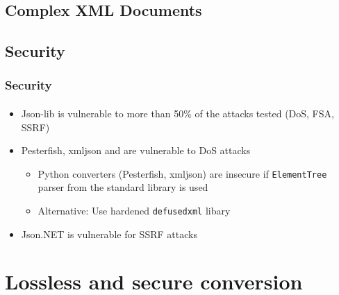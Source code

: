 \documentclass[
    alternativetitlepage=alternativ,
    cornerlogo=hgi_nds_logo2,
    sectionoverview,
]{rubpresentation}
\begin{document}
\subsection{Complex XML Documents}

\begingroup
  \begin{frame}[fragile]
    \vspace{-1.15cm}
    \begin{center}
      
    \end{center}
  \end{frame}
\endgroup

\subsection{Security}

\begin{frame}
  \frametitle{Security}
  \framesubtitle{}
  \begin{itemize}
    \item{} Json-lib is vulnerable to more than 50\% of the attacks tested (DoS, FSA, SSRF)
    \item{} Pesterfish, xmljson and are vulnerable to DoS attacks
      \begin{itemize}
        \item{} Python converters (Pesterfish, xmljson) are insecure if \texttt{ElementTree} parser from the standard
          library is used
        \item{} Alternative: Use hardened \texttt{defusedxml} libary
      \end{itemize}
    \item{} Json.NET is vulnerable for SSRF attacks
  \end{itemize}
\end{frame}

\begingroup
  \begin{frame}[fragile]
    \vspace{-1.15cm}
    \begin{center}
      
    \end{center}
  \end{frame}
\endgroup

\section{Lossless and secure conversion}
\end{document}
